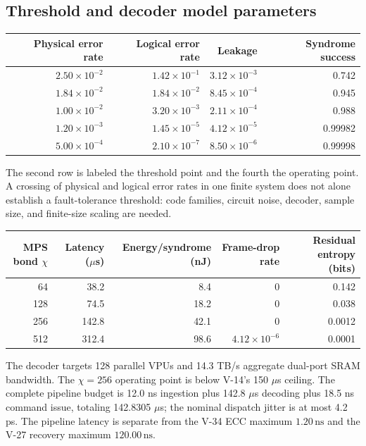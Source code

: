 \documentclass[11pt,a4paper]{article}
\newcommand{\unit}[1]{\,\mathrm{#1}}
\begin{document}
\subsection{Threshold and decoder model parameters}
\begin{center}\small
\begin{tabular}{@{}rrrr@{}}\toprule
Physical error rate & Logical error rate & Leakage & Syndrome success\\\midrule
$2.50\times10^{-2}$ & $1.42\times10^{-1}$ & $3.12\times10^{-3}$ & 0.742\\
$1.84\times10^{-2}$ & $1.84\times10^{-2}$ & $8.45\times10^{-4}$ & 0.945\\
$1.00\times10^{-2}$ & $3.20\times10^{-3}$ & $2.11\times10^{-4}$ & 0.988\\
$1.20\times10^{-3}$ & $1.45\times10^{-5}$ & $4.12\times10^{-5}$ & 0.99982\\
$5.00\times10^{-4}$ & $2.10\times10^{-7}$ & $8.50\times10^{-6}$ & 0.99998\\\bottomrule
\end{tabular}\end{center}
The second row is labeled the threshold point and the fourth
the operating point. A crossing of physical and logical error rates in one finite system
does not alone establish a fault-tolerance threshold: code families, circuit noise, decoder,
sample size, and finite-size scaling are needed.
\begin{center}\small
\begin{tabular}{@{}rrrrr@{}}\toprule
MPS bond $\chi$ & Latency ($\mu$s) & Energy/syndrome (nJ) & Frame-drop rate & Residual entropy (bits)\\\midrule
64 & 38.2 & 8.4 & 0 & 0.142\\
128 & 74.5 & 18.2 & 0 & 0.038\\
256 & 142.8 & 42.1 & 0 & 0.0012\\
512 & 312.4 & 98.6 & $4.12\times10^{-6}$ & 0.0001\\\bottomrule
\end{tabular}\end{center}
The decoder targets 128 parallel VPUs and 14.3 TB/s aggregate dual-port SRAM bandwidth.
The $\chi=256$ operating point is below V-14's 150 $\mu$s ceiling.
The complete pipeline budget is 12.0 ns ingestion plus 142.8 $\mu$s decoding plus
18.5 ns command issue, totaling 142.8305 $\mu$s; the nominal dispatch jitter is at most 4.2 ps.
The pipeline latency is separate from the V-34 ECC maximum $1.20\unit{ns}$ and
the V-27 recovery maximum $120.00\unit{ns}$.
\end{document}
